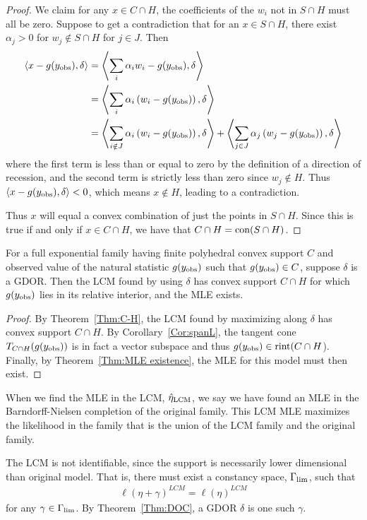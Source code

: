 \begin{proof}
We claim for any $x \in C \cap H$, the coefficients of the $w_i$ not in $S \cap H$ must all be zero.  Suppose to get a contradiction that for an $x \in S \cap H$, there exist $\alpha_j > 0$ for $w_j \notin S \cap H$ for $j \in J$.  Then 
\begin{align*}
	\langle x - g(y_{\text{obs}}), \delta  \rangle &= \left \langle  \sum_i \alpha_i w_i - g(y_{\text{obs}}), \delta \right  \rangle \\
	&= \left \langle  \sum_i \alpha_i \left( w_i - g(y_{\text{obs}}) \right), \delta \right  \rangle\\
	&=  \left \langle  \sum_{i \notin J} \alpha_i \left( w_i - g(y_{\text{obs}}) \right), \delta \right  \rangle
		+ \left \langle  \sum_{j\in J} \alpha_j \left( w_j - g(y_{\text{obs}}) \right), \delta \right  \rangle
\end{align*}
where the first term is less than or equal to zero by the definition of a direction of
recession, and the second term is strictly less than zero since $w_j \notin H$.  Thus 
$\langle x - g(y_{\text{obs}}), \delta  \rangle < 0$, which means $x \notin H$, leading to a contradiction.

Thus $x$ will equal a convex combination of just the points in $S \cap H$.  Since this is 
true if and only if $x \in C \cap H$, we have that $C \cap H = \operatorname{con}( S\cap H)$.
\end{proof}

\begin{corollary} \label{Cor:LCM MLE exists}
For a full exponential family having finite polyhedral convex support $C$ and 
observed value of the natural statistic $g(y_{\text{obs}})$ such that $g(y_{\text{obs}}) \in C$, 
suppose $\delta$ is a GDOR.  Then the LCM found by using $\delta$ has convex
support $C \cap H$ for which $g(y_{\text{obs}})$ lies in its relative interior, and the MLE exists.
\end{corollary}
\begin{proof}
By Theorem~\ref{Thm:C-H}, the LCM found by maximizing along $\delta$ has 
convex support $C \cap H$.  By Corollary~\ref{Cor:spanL},  the tangent cone 
$T_{C \cap H} (g(y_{\text{obs}}))$ is in fact a vector subspace and thus 
$g(y_{\text{obs}}) \in \operatorname{rint} (C \cap H$).  Finally, by Theorem~\ref{Thm:MLE existence}, 
the MLE for this model must then exist.
\end{proof}

When we find the MLE in the LCM, $\hat{\eta}_{\textrm{LCM}}$, we say we have found an MLE in the Barndorff-Nielsen completion of the original family.  This LCM MLE maximizes the likelihood in 
the family that is the union of the LCM family and the original family.

The LCM is not identifiable, since the support is necessarily lower dimensional 
than original model.  That is, there must exist a constancy space, $\Gamma_{\textrm{lim}}$, such that 
\begin{align} \label{E:Gammalim}
\ell( \eta + \gamma )^{LCM} = \ell( \eta )^{LCM}
\end{align}
for any $\gamma \in \Gamma_{\textrm{lim}}$.  By Theorem~\ref{Thm:DOC}, a GDOR $\delta$ 
is one such $\gamma$.


